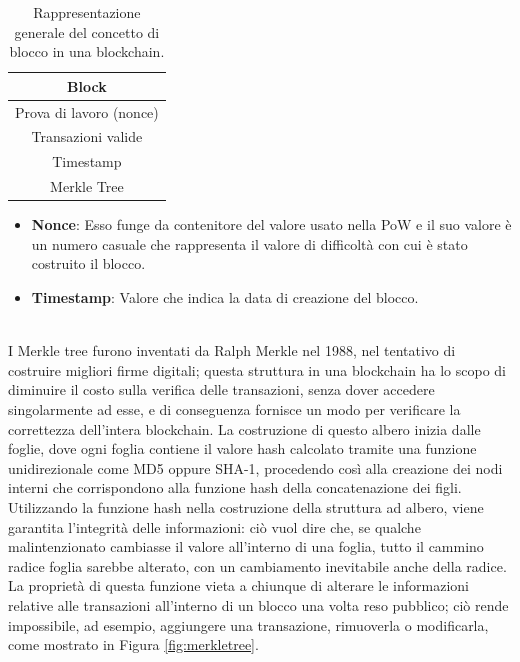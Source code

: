 \begin{table}[ht]
       \centering\small
           \begin{tabular}{|c|}
               \hline
               \textbf{Block}\\
               \hline \hline
               Prova di lavoro (nonce)   \\
               \hline
               Transazioni valide \\
               \hline
               Timestamp \\
               \hline
               Merkle Tree \\
               \hline
       \end{tabular}
       \caption{Rappresentazione generale del concetto di blocco in una blockchain.\label{tab:bitcoinblock}}
   \end{table}



\begin{itemize}
  \item {\bf Nonce\/}: Esso funge da contenitore del valore usato nella PoW e il suo valore è un numero casuale che rappresenta il valore di difficoltà con cui è stato costruito il blocco.
  \item {\bf Timestamp\/}: Valore che indica la data di creazione del blocco.
\end{itemize}
\leavevmode
\\
I Merkle tree furono inventati da Ralph Merkle nel 1988, nel tentativo di costruire migliori firme digitali; questa struttura in una blockchain ha lo scopo di diminuire il costo sulla verifica delle transazioni, senza dover accedere singolarmente ad esse, e di conseguenza fornisce un modo per verificare la correttezza dell’intera blockchain.
La costruzione di questo albero inizia dalle foglie, dove ogni foglia contiene il valore hash calcolato tramite una funzione unidirezionale come MD5 oppure SHA-1, procedendo così alla creazione dei nodi interni che corrispondono alla funzione hash della concatenazione dei figli.
Utilizzando la funzione hash nella costruzione della struttura ad albero, viene garantita l’integrità delle informazioni: ciò vuol dire che, se qualche malintenzionato cambiasse il valore all’interno di una foglia, tutto il cammino radice foglia sarebbe alterato, con un cambiamento inevitabile anche della radice.
La proprietà di questa funzione vieta a chiunque di alterare le informazioni relative alle transazioni all’interno di un blocco una volta reso pubblico; ciò rende impossibile, ad esempio, aggiungere una transazione, rimuoverla o modificarla, come mostrato in Figura \ref{fig:merkletree}.

